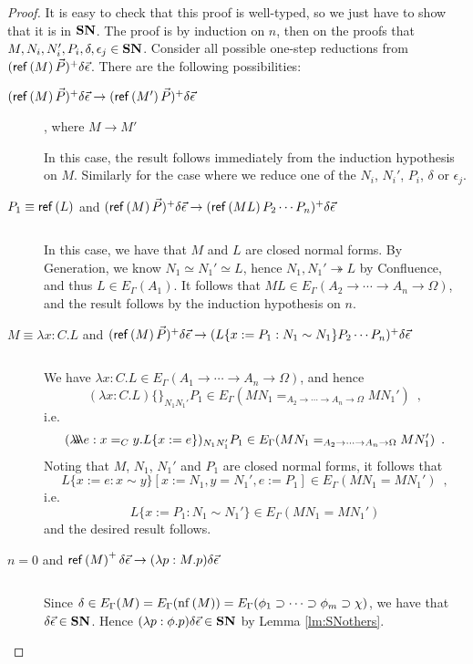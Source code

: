 \begin{proof}
It is easy to check that this proof is well-typed, so we just have to show that it is in $\mathbf{SN}$.  The proof is by
induction on $n$, then on the proofs that $M, N_i, N_i', P_i, \delta, \epsilon_j \in \mathbf{SN}$.  Consider all possible one-step
reductions from $(\mathsf{ref} \left( {M} \right) \vec{P})^+ \delta \vec{\epsilon}$.  There are the following possibilities:
\begin{description}
\item[$(\mathsf{ref} \left( {M} \right) \vec{P})^+ \delta \vec{\epsilon} \rightarrow (\mathsf{ref} \left( {M'} \right) \vec{P})^+ \delta \vec{\epsilon}$], where
$M \rightarrow M'$

In this case, the result follows immediately from the induction hypothesis on $M$.  Similarly for the case where we reduce
one of the $N_i$, $N_i'$, $P_i$, $\delta$ or $\epsilon_j$.
\item[$P_1 \equiv \mathsf{ref} \left( {L} \right)$ and $(\mathsf{ref} \left( {M} \right) \vec{P})^+ \delta \vec{\epsilon} \rightarrow (\mathsf{ref} \left( {M L} \right) P_2 \cdots P_n)^+ \delta \vec{\epsilon}$]$ $

In this case, we have that $M$ and $L$ are closed normal forms.  By Generation, we know $N_1 \simeq N_1' \simeq L$, hence $N_1, N_1' \twoheadrightarrow L$
by Confluence, and thus $L \in E_\Gamma(A_1)$.  It follows that $ML \in E_\Gamma(A_2 \rightarrow \cdots \rightarrow A_n \rightarrow \Omega)$, and
the result follows by the induction hypothesis on $n$.
\item[$M \equiv \lambda x:C.L$ and $(\mathsf{ref} \left( {M} \right) \vec{P})^+ \delta \vec{\epsilon} \rightarrow (L \{ x := P_1 : N_1 \sim N_1 \} P_2 \cdots P_n)^+ \delta \vec{\epsilon}$]$ $

We have $\lambda x:C.L \in E_\Gamma(A_1 \rightarrow \cdots \rightarrow A_n \rightarrow \Omega)$, and hence
\[ (\lambda x:C.L)\{\}_{N_1 N_1'} P_1 \in E_\Gamma(M N_1 =_{A_2 \rightarrow \cdots \rightarrow A_n \rightarrow \Omega} M N_1') \enspace , \]
i.e.
\[ (\lambda \!\! \lambda \!\! \lambda e : x =_C y. L \{ x := e \})_{N_1 N_1'} P_1 \in E_\Gamma(M N_1 =_{A_2 \rightarrow \cdots \rightarrow A_n \rightarrow \Omega} M N_1') \enspace . \]
Noting that $M$, $N_1$, $N_1'$ and $P_1$ are closed normal forms, it follows that
\[ L \{ x:= e : x \sim y \} [ x := N_1, y = N_1', e := P_1 ] \in E_\Gamma(M N_1 = M N_1') \enspace , \]
i.e.
\[ L \{ x := P_1 : N_1 \sim N_1' \} \in E_\Gamma(M N_1 = M N_1') \]
and the desired result follows.
\item[$n = 0$ and $\mathsf{ref} \left( {M} \right)^+ \delta \vec{\epsilon} \rightarrow (\lambda p:M.p)\delta \vec{\epsilon}$]
$ $

Since $\delta \in E_\Gamma(M) = E_\Gamma(\mathrm{nf} \left( {M} \right)) = E_\Gamma(\phi_1 \supset \cdots \supset \phi_m \supset \chi)$, we have that
$\delta \vec{\epsilon} \in \mathbf{SN}$.  Hence $(\lambda p:\phi.p) \delta \vec{\epsilon} \in \mathbf{SN}$ by Lemma \ref{lm:SNothers}.
\end{description}
\end{proof}

